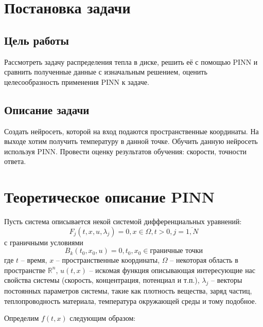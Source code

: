 \documentclass[a4paper,14pt]{extarticle} %
\begin{document}
\newpage
\section{Постановка задачи}

\subsection{Цель работы}


Рассмотреть задачу распределения тепла в диске, решить её с помощью PINN и сравнить полученные данные с изначальным решением, оценить целесообразность применения PINN к задаче.

\subsection{Описание задачи}

Создать нейросеть, которой на вход подаются пространственные координаты. На выходе хотим получить температуру в данной точке. Обучить данную нейросеть используя PINN. Провести оценку результатов обучения: скорости, точности ответа.

\newpage
\section{Теоретическое описание PINN}

Пусть система описывается некой системой дифференциальных уравнений:
\begin{equation}\label{eq:1syst}
    F_j(t, x, u, \lambda_j) = 0, x\in\Omega, t > 0, j=\overline{1,N}
\end{equation}
с граничными условиями
\begin{equation}
    B_k(t_0,x_0, u) = 0, t_0, x_0 \in \text{граничные точки}
\end{equation}
где $t$ -- время, $x$ -- пространственные координаты, $\Omega$ -- некоторая область в пространстве $\mathbb{R}^n$,  $u(t,x)$ -- искомая функция описывающая интересующие нас свойства системы (скорость, концентрация, потенциал и т.п.), $\lambda_j$ -- векторы постоянных параметров системы, такие как плотность вещества, заряд частиц, теплопроводность материала, температура окружающей среды и тому подобное.

Определим $f(t, x)$ следующим образом:
\end{document}
